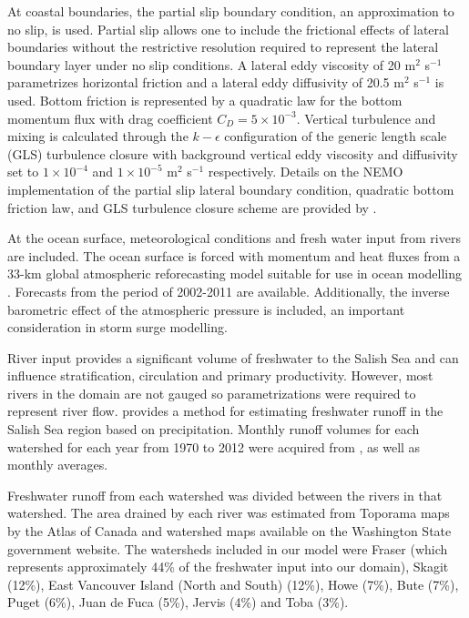 \documentclass[pdftex,10pt]{article}
\begin{document}
At coastal boundaries, the partial slip boundary condition, an approximation to no slip, is used. Partial slip allows one to include the frictional effects of lateral boundaries without the restrictive resolution required to represent the lateral boundary layer under no slip conditions. A lateral eddy viscosity of 20 m$^2$ s$^{-1}$ parametrizes horizontal friction and a lateral eddy diffusivity of 20.5 m$^2$ s$^{-1}$ is used.  Bottom friction is represented by a quadratic law for the bottom momentum flux with drag coefficient $C_D = 5\times 10^{-3}$. Vertical turbulence and mixing is calculated through the $k-\epsilon$ configuration of the generic length scale (GLS) turbulence closure \citep{umlauf2003generic} with background vertical eddy viscosity and diffusivity set to $1\times10^{-4}$ and $1\times10^{-5}$ m$^2$ s$^{-1}$ respectively. Details on the NEMO implementation of the partial slip lateral boundary condition, quadratic bottom friction law, and GLS turbulence closure scheme are provided by \citet{madec2012nemo}.

At the ocean surface, meteorological conditions and fresh water input from rivers are included. The ocean surface is forced with momentum and heat fluxes from a 33-km global atmospheric reforecasting model suitable for use in ocean modelling \citep{smith2014new}. Forecasts from the period of 2002-2011 are available. Additionally, the inverse barometric effect of the atmospheric pressure is included, an important consideration in storm surge modelling. 

River input provides a significant volume of freshwater to the Salish Sea and can influence stratification, circulation and primary productivity. However, most rivers in the domain are not gauged so parametrizations were required to represent river flow. \citet{morrison2011rivers} provides a method for estimating freshwater runoff in the Salish Sea region based on precipitation. Monthly runoff volumes for each watershed for each year from 1970 to 2012 were acquired from \citet{morrison2011rivers}, as well as monthly averages. 

Freshwater runoff from each watershed was divided between the rivers in that watershed. The area drained by each river was estimated from Toporama maps by the Atlas of Canada and watershed maps available on the Washington State government website. The watersheds included in our model were Fraser (which represents approximately 44\% of the freshwater input into our domain), Skagit (12\%), East Vancouver Island (North and South) (12\%), Howe (7\%), Bute (7\%), Puget (6\%), Juan de Fuca (5\%), Jervis (4\%) and Toba (3\%). 
\end{document}
